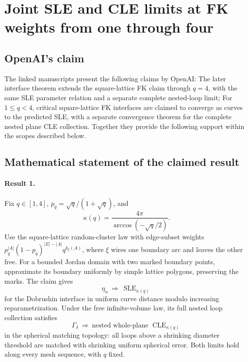 \documentclass[11pt]{article}
\begin{document}
\section*{Joint SLE and CLE limits at FK weights from one through four}

\subsection{OpenAI's claim}
The linked manuscripts present the following claims by OpenAI: The later interface theorem extends the square-lattice FK claim through $q=4$, with the same SLE parameter relation and a separate complete nested-loop limit; For $1\leq q<4$, critical square-lattice FK interfaces are claimed to converge as curves to the predicted SLE, with a separate convergence theorem for the complete nested plane CLE collection. Together they provide the following support within the scopes described below.

\subsection{Mathematical statement of the claimed result}
\paragraph{Result 1.} Fix \(q\in[1,4]\), \(p_q=\sqrt q/(1+\sqrt q)\), and
\[
 \kappa(q)=\frac{4\pi}{\arccos(-\sqrt q/2)}.
\]
Use the square-lattice random-cluster law with edge-subset weights \(p_q^{|A|}(1-p_q)^{|E|-|A|}q^{k_\xi(A)}\), where \(\xi\) wires one boundary arc and leaves the other free. For a bounded Jordan domain with two marked boundary points, approximate its boundary uniformly by simple lattice polygons, preserving the marks. The claim gives
\[
 \eta_n\ \Longrightarrow\ \operatorname{SLE}_{\kappa(q)}
\]
for the Dobrushin interface in uniform curve distance modulo increasing reparametrization. Under the free infinite-volume law, its full nested loop collection satisfies
\[
 \Gamma_\delta\ \Longrightarrow\ \text{nested whole-plane }\operatorname{CLE}_{\kappa(q)}
\]
in the spherical matching topology: all loops above a shrinking diameter threshold are matched with shrinking uniform spherical error. Both limits hold along every mesh sequence, with \(q\) fixed.
\end{document}
